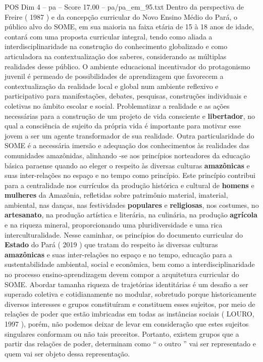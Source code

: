 \begin{textsample}{POS Dim 4 – pa – Score 17.00 – pa/pa\_em\_95.txt}
Dentro da perspectiva de Freire ( 1987 ) e da concepção curricular do Novo Ensino Médio do Pará, o público alvo do SOME, em sua maioria na faixa etária de 15 à 18 anos de idade, contará com uma proposta curricular integral, tendo como aliada a interdisciplinaridade na construção do conhecimento globalizado e como articuladora na contextualização dos saberes, considerando as múltiplas realidades desse público.
O ambiente educacional incentivador do protagonismo juvenil é permeado de possibilidades de aprendizagem que favorecem a contextualização da realidade local e global num ambiente reflexivo e participativo para manifestações, debates, pesquisas, construções individuais e coletivas no âmbito escolar e social.
Problematizar a realidade e as ações necessárias para a construção de um projeto de vida consciente e \textbf{libertador}, no qual a consciência de sujeito da própria vida é importante para motivar esse jovem a ser um agente transformador de sua realidade.
Outra particularidade do SOME é a necessária imersão e adequação dos conhecimentos às realidades das comunidades amazônidas, alinhando -se aos princípios norteadores da educação básica paraense quando ao eleger o respeito às diversas culturas \textbf{amazônicas} e suas inter-relações no espaço e no tempo como princípio.
Este princípio contribui para a centralidade nos currículos da produção histórica e cultural de \textbf{homens} e \textbf{mulheres} da Amazônia, refletidas sobre patrimônio material, imaterial, ambiental, nas danças, nas festividades \textbf{populares} e \textbf{religiosas}, nos costumes, no \textbf{artesanato}, na produção artística e literária, na culinária, na produção \textbf{agrícola} e na riqueza mineral, proporcionando uma pluridiversidade e uma rica interculturalidade.
Nesse caminhar, os princípios do documento curricular do \textbf{Estado} do Pará ( 2019 ) que tratam do respeito às diversas culturas \textbf{amazônicas} e suas inter-relações no espaço e no tempo, educação para a sustentabilidade ambiental, social e econômica, bem como a interdisciplinaridade no processo ensino-aprendizagem devem compor a arquitetura curricular do SOME.
Abordar tamanha riqueza de trajetórias identitárias é um desafio a ser superado coletiva e cotidianamente no modular, sobretudo porque historicamente diversos interesses e grupos constituíram e constituem esses sujeitos, por meio de relações de poder que estão imbricadas em todas as instâncias sociais ( LOURO, 1997 ), porém, não podemos deixar de levar em consideração que estes sujeitos singulares conformam ou não tais preceitos.
Portanto, existem grupos que a partir das relações de poder, determinam como “ o outro ” vai ser representado e quem vai ser objeto dessa representação.

\end{textsample}
